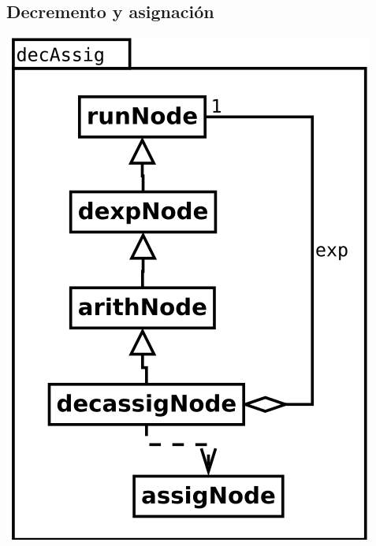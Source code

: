 \subsection {Decremento y asignación}
\begin{center}
\includegraphics[scale=0.4]{decAssig.png} \\
\end{center}

